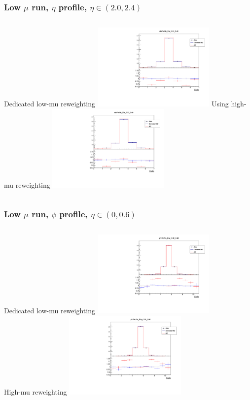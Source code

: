 \documentclass{beamer}
\begin{document}
\begin{frame}
\frametitle{Low $\mu$ run, $\eta$ profile, $\eta \in (2.0,2.4)$}

\begin{columns}[t]

\centering
\normalsize{Dedicated low-mu reweighting}
\includegraphics[width=6cm]{etaProfile_Rew_Eta_20_24_lowmu_13TeV_LocalWB.pdf}
\centering
\normalsize{Using high-mu reweighting}
\includegraphics[width=6cm]{etaProfile_Eta_20_24_lowmu_13TeV_AthenaWB.pdf}
\end{columns}
\end{frame}
\begin{frame}
\frametitle{Low $\mu$ run, $\phi$ profile, $\eta \in (0,0.6)$}

\begin{columns}[t]

\centering
\normalsize{Dedicated low-mu reweighting}
\includegraphics[width=6cm]{phiProfile_Rew_Eta_0_6_lowmu_13TeV_LocalWB.pdf}\\
\centering
\normalsize{High-mu reweighting}
\includegraphics[width=6cm]{phiProfile_Eta_0_6_lowmu_13TeV_AthenaWB.pdf}\\
\end{columns}
\end{frame}
\end{document}
